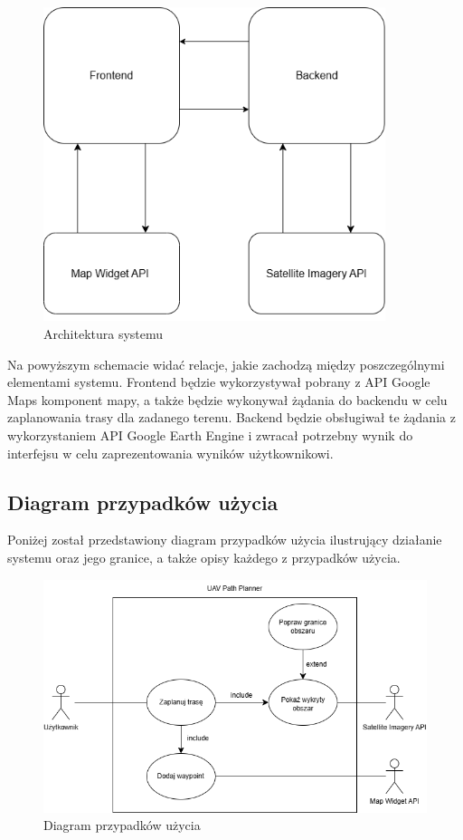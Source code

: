 \begin{figure}[H]
    \centering
    \includegraphics[width=10cm]{images/Architektura_systemu.png}
    \caption{Architektura systemu}
\end{figure}

Na powyższym schemacie widać relacje, jakie zachodzą między poszczególnymi elementami systemu. Frontend będzie wykorzystywał pobrany z API Google Maps komponent mapy, a także będzie wykonywał żądania do backendu w celu zaplanowania trasy dla zadanego terenu. Backend będzie obsługiwał te żądania z wykorzystaniem API Google Earth Engine i zwracał potrzebny wynik do interfejsu w celu zaprezentowania wyników użytkownikowi.

\subsection{Diagram przypadków użycia}

Poniżej został przedstawiony diagram przypadków użycia ilustrujący działanie systemu oraz jego granice, a także opisy każdego z przypadków użycia.

\begin{figure}[H]
    \centering
    \includegraphics[width=15cm]{images/Diagram_przypadków_użycia.png}
    \caption{Diagram przypadków użycia}
\end{figure}

